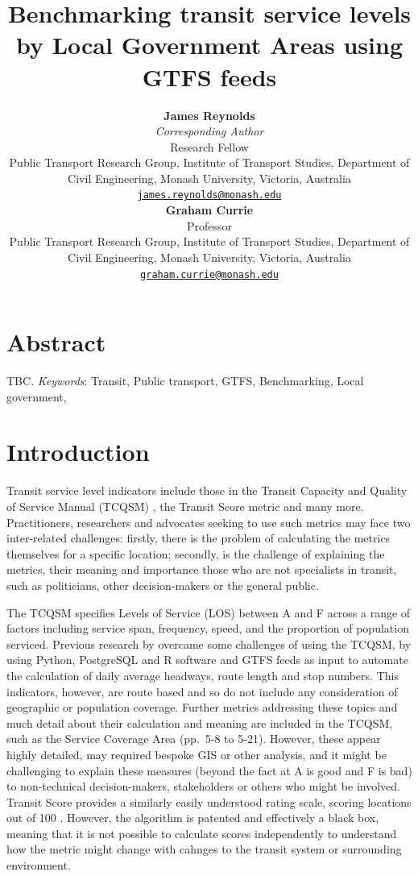\documentclass[numbered]{trbunofficial}
\title{Benchmarking transit service levels by Local Government Areas
using GTFS feeds}
\author{%
    \textbf{James Reynolds}\\\textit{Corresponding Author}\\
  Research Fellow\\
  Public Transport Research Group, Institute of Transport Studies,
Department of Civil Engineering, Monash University, Victoria,
Australia\\
  \href{mailto:james.reynolds@monash.edu}{\nolinkurl{james.reynolds@monash.edu}}\\
  \hfill\break
    \textbf{Graham Currie}\\
  Professor\\
  Public Transport Research Group, Institute of Transport Studies,
Department of Civil Engineering, Monash University, Victoria,
Australia\\
  \href{mailto:graham.currie@monash.edu}{\nolinkurl{graham.currie@monash.edu}}\\
  \hfill\break
  }
\begin{document}
\maketitle


\section{Abstract}
TBC.
\hfill\break%
\hfill\break%
\noindent\textit{Keywords}:  Transit, Public
transport, GTFS, Benchmarking, Local government,  
\newpage

\hypertarget{introduction}{%
\section{Introduction}\label{introduction}}

Transit service level indicators include those in the Transit Capacity
and Quality of Service Manual (TCQSM) \citep{TCQSM:2013}, the Transit
Score metric and many more. Practitioners, researchers and advocates
seeking to use such metrics may face two inter-related challenges:
firstly, there is the problem of calculating the metrics themselves for
a specific location; secondly, is the challenge of explaining the
metrics, their meaning and importance those who are not specialists in
transit, such as politicians, other decision-makers or the general
public.

The TCQSM specifies Levels of Service (LOS) between A and F across a
range of factors including service span, frequency, speed, and the
proportion of population serviced. Previous research by
\citet{Wong:2013aa} overcame some challenges of using the TCQSM, by
using Python, PostgreSQL and R software and GTFS feeds as input to
automate the calculation of daily average headways, route length and
stop numbers. This indicators, however, are route based and so do not
include any consideration of geographic or population coverage. Further
metrics addressing these topics and much detail about their calculation
and meaning are included in the TCQSM, such as the Service Coverage Area
(pp.~5-8 to 5-21). However, these appear highly detailed, may required
bespoke GIS or other analysis, and it might be challenging to explain
these measures (beyond the fact at A is good and F is bad) to
non-technical decision-makers, stakeholders or others who might be
involved. Transit Score provides a similarly easily understood rating
scale, scoring locations out of 100 \citep{WalkScore:2023tg}. However,
the algorithm is patented and effectively a black box, meaning that it
is not possible to calculate scores independently to understand how the
metric might change with cahnges to the transit system or surrounding
environment.
\end{document}

